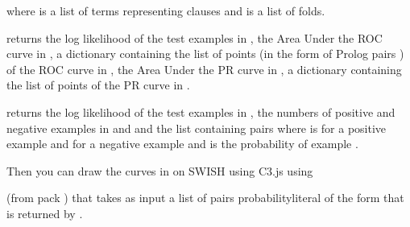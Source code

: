 \documentclass[letterpaper,10pt,english]{sphinxmanual}
\begin{document}
\sphinxAtStartPar
where  is a list of terms representing clauses and  is a list of folds.

\sphinxAtStartPar
{} returns the log likelihood of the test examples in , the Area Under the ROC curve in , a dictionary containing the list of points (in the form of Prolog pairs ) of the ROC curve in , the Area Under the PR curve in , a dictionary containing the list of points of the PR curve in .

\sphinxAtStartPar
{} returns the log likelihood of the test examples in , the numbers of positive and negative examples in  and  and the list  containing pairs  where  is  for  a positive example and  for  a negative example and  is the probability of example .

\sphinxAtStartPar
Then you can draw the curves in  on SWISH using C3.js using

\begin{sphinxVerbatim}[commandchars=\\\{\}]
  
\end{sphinxVerbatim}

\sphinxAtStartPar
(from pack ) that takes as input a list  of pairs probability\sphinxhyphen{}literal of the form that is returned by .
\end{document}

